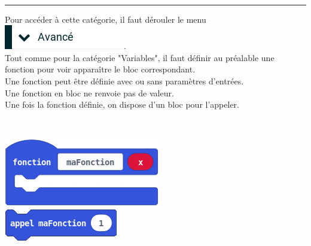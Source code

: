 \begin{minipage}[t]{0.75\linewidth}

    \begin{blocFonctions}\\
      \rule{-0.25em}{2em}
      Pour accéder à cette catégorie, il faut dérouler le menu \includegraphics[scale=0.5]{res/blocsMkCd/MB_makecode_avance.png}.\\
      Tout comme pour la catégorie "Variables", il faut définir au préalable une fonction pour voir apparaître le bloc correspondant.\\
      \vspace{5mm}
      Une fonction peut être définie avec ou sans paramètres d'entrées.\\
      Une fonction en bloc ne renvoie pas de valeur.\\
      Une fois la fonction définie, on dispose d'un bloc pour l'appeler.


    \end{blocFonctions}

\end{minipage}
\hfill
\begin{minipage}[t]{0.25\linewidth}~\\
  \vspace{5mm}

    \includegraphics[scale=0.4]{res/blocsMkCd/MB_makecode_fonctions-definir.png}\\[0.5em]
    \includegraphics[scale=0.4]{res/blocsMkCd/MB_makecode_fonctions-appeler.png}\\[0.5em]


\end{minipage}

